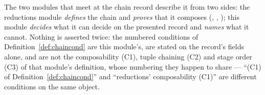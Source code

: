 
\begin{remark}\label{rem:chaincond-reductions}
The two modules that meet at the chain record describe it from two sides: the
reductions module \emph{defines} the chain and \emph{proves} that it composes
(, ,
); this module \emph{decides} what it can decide
on the presented record and \emph{names} what it cannot. Nothing is asserted
twice: the numbered conditions of Definition~\ref{def:chaincond} are this
module's, are stated on the record's fields alone, and are not the
composability (C1), tuple chaining (C2) and stage order (C3) of that module's
definition, whose numbering they happen to share --- ``(C1) of
Definition~\ref{def:chaincond}'' and ``reductions' composability (C1)'' are
different conditions on the same object.
\end{remark}
